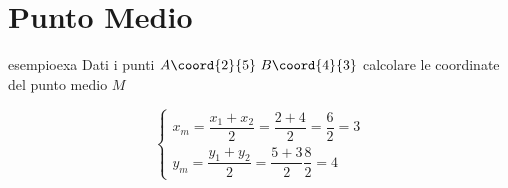 \chapter{Punto Medio}
\begin{esempiot}{esempio}{exa}
	Dati i punti $A\coord{2}{5}$\,$B\coord{4}{3}$ calcolare le coordinate del punto medio $M$
\end{esempiot}
\begin{equation}
\begin{cases}
	x_m=\dfrac{x_1+x_2}{2}=\dfrac{2+4}{2}=\dfrac{6}{2}=3\\[0.8cm]
	y_m=\dfrac{y_1+y_2}{2}=\dfrac{5+3}{2}\dfrac{8}{2}=4
\end{cases}
\end{equation}